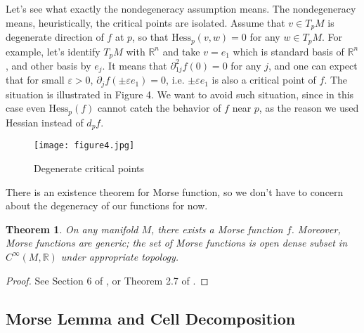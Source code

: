 \documentclass{article}
\newtheorem{theorem}{Theorem}[section]
\newcommand{\R}{\mathbb{R}}
\newcommand{\ep}{\varepsilon}
\newcommand{\pp}{\partial}
\newcommand{\Hess}{\mathrm{Hess}}
\begin{document}
Let's see what exactly the nondegeneracy assumption means.
The nondegeneracy means, heuristically, the critical points are isolated.
Assume that $v\in T_pM$ is degenerate direction of $f$ at $p$, so that $\Hess_p(v,w)=0$ for any $w\in T_p M$.
For example, let's identify $T_pM$ with $\R^n$ and take $v=e_1$ which is standard basis of $\R^n$, and other basis by $e_j$.
It means that $\pp^2_{1j}f(0)=0$ for any $j$, and one can expect that for small $\ep>0$, $\pp_jf(\pm\ep e_1)=0$, i.e. $\pm\ep e_1$ is also a critical point of $f$.
The situation is illustrated in Figure 4.
We want to avoid such situation, since in this case even $\Hess_p(f)$ cannot catch the behavior of $f$ near $p$, as the reason we used Hessian instead of $d_pf$.

\begin{figure}[h]
		\centering
		\texttt{[image: figure4.jpg]}
		\caption{Degenerate critical points}
\end{figure}

There is an existence theorem for Morse function, so we don't have to concern about the degeneracy of our functions for now.
	\begin{theorem}\rm
	On any manifold $M$, there exists a Morse function $f$.
	Moreover, Morse functions are generic; the set of Morse functions is open dense subset in $C^\infty(M,\R)$ under appropriate topology.
	\end{theorem}
		\begin{proof}
		See Section 6 of \cite{m1}, or Theorem 2.7 of \cite{m2}.
		\end{proof}

\subsection{Morse Lemma and Cell Decomposition}
\end{document}
